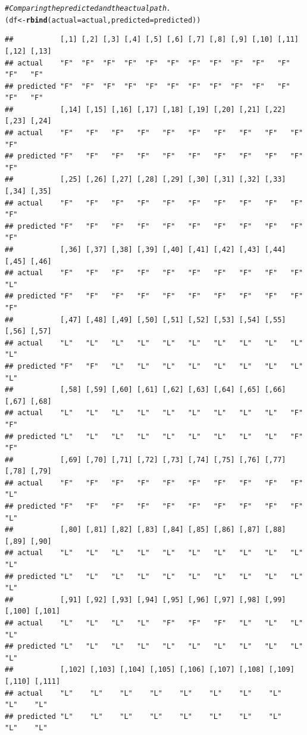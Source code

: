 \documentclass{article}\usepackage[]{graphicx}\usepackage[]{color}
\makeatletter
\newcommand{\hlcom}[1]{\textcolor[rgb]{0.678,0.584,0.686}{\textit{#1}}}%
\newcommand{\hlstd}[1]{\textcolor[rgb]{0.345,0.345,0.345}{#1}}%
\newcommand{\hlkwb}[1]{\textcolor[rgb]{0.69,0.353,0.396}{#1}}%
\newcommand{\hlkwc}[1]{\textcolor[rgb]{0.333,0.667,0.333}{#1}}%
\newcommand{\hlkwd}[1]{\textcolor[rgb]{0.737,0.353,0.396}{\textbf{#1}}}%
\newenvironment{kframe}{%
 \def\at@end@of@kframe{}%
 \ifinner\ifhmode%
  \def\at@end@of@kframe{\end{minipage}}%
  \begin{minipage}{\columnwidth}%
 \fi\fi%
 \def\FrameCommand##1{\hskip\@totalleftmargin \hskip-\fboxsep
 \colorbox{shadecolor}{##1}\hskip-\fboxsep
     \hskip-\linewidth \hskip-\@totalleftmargin \hskip\columnwidth}%
 \MakeFramed {\advance\hsize-\width
   \@totalleftmargin\z@ \linewidth\hsize
   \@setminipage}}%
 {\par\unskip\endMakeFramed%
 \at@end@of@kframe}
\newenvironment{knitrout}{}{} %
\makeatother
\begin{document}
\begin{knitrout}
\begin{kframe}
\begin{alltt}
\hlcom{# Comparing the predicted and the actual path. }
\hlstd{(df} \hlkwb{<-} \hlkwd{rbind}\hlstd{(}\hlkwc{actual} \hlstd{= actual,} \hlkwc{predicted} \hlstd{= predicted))}
\end{alltt}
\begin{verbatim}
##           [,1] [,2] [,3] [,4] [,5] [,6] [,7] [,8] [,9] [,10] [,11] [,12] [,13]
## actual    "F"  "F"  "F"  "F"  "F"  "F"  "F"  "F"  "F"  "F"   "F"   "F"   "F"  
## predicted "F"  "F"  "F"  "F"  "F"  "F"  "F"  "F"  "F"  "F"   "F"   "F"   "F"  
##           [,14] [,15] [,16] [,17] [,18] [,19] [,20] [,21] [,22] [,23] [,24]
## actual    "F"   "F"   "F"   "F"   "F"   "F"   "F"   "F"   "F"   "F"   "F"  
## predicted "F"   "F"   "F"   "F"   "F"   "F"   "F"   "F"   "F"   "F"   "F"  
##           [,25] [,26] [,27] [,28] [,29] [,30] [,31] [,32] [,33] [,34] [,35]
## actual    "F"   "F"   "F"   "F"   "F"   "F"   "F"   "F"   "F"   "F"   "F"  
## predicted "F"   "F"   "F"   "F"   "F"   "F"   "F"   "F"   "F"   "F"   "F"  
##           [,36] [,37] [,38] [,39] [,40] [,41] [,42] [,43] [,44] [,45] [,46]
## actual    "F"   "F"   "F"   "F"   "F"   "F"   "F"   "F"   "F"   "F"   "L"  
## predicted "F"   "F"   "F"   "F"   "F"   "F"   "F"   "F"   "F"   "F"   "F"  
##           [,47] [,48] [,49] [,50] [,51] [,52] [,53] [,54] [,55] [,56] [,57]
## actual    "L"   "L"   "L"   "L"   "L"   "L"   "L"   "L"   "L"   "L"   "L"  
## predicted "F"   "F"   "L"   "L"   "L"   "L"   "L"   "L"   "L"   "L"   "L"  
##           [,58] [,59] [,60] [,61] [,62] [,63] [,64] [,65] [,66] [,67] [,68]
## actual    "L"   "L"   "L"   "L"   "L"   "L"   "L"   "L"   "L"   "F"   "F"  
## predicted "L"   "L"   "L"   "L"   "L"   "L"   "L"   "L"   "L"   "F"   "F"  
##           [,69] [,70] [,71] [,72] [,73] [,74] [,75] [,76] [,77] [,78] [,79]
## actual    "F"   "F"   "F"   "F"   "F"   "F"   "F"   "F"   "F"   "F"   "L"  
## predicted "F"   "F"   "F"   "F"   "F"   "F"   "F"   "F"   "F"   "F"   "L"  
##           [,80] [,81] [,82] [,83] [,84] [,85] [,86] [,87] [,88] [,89] [,90]
## actual    "L"   "L"   "L"   "L"   "L"   "L"   "L"   "L"   "L"   "L"   "L"  
## predicted "L"   "L"   "L"   "L"   "L"   "L"   "L"   "L"   "L"   "L"   "L"  
##           [,91] [,92] [,93] [,94] [,95] [,96] [,97] [,98] [,99] [,100] [,101]
## actual    "L"   "L"   "L"   "L"   "F"   "F"   "F"   "L"   "L"   "L"    "L"   
## predicted "L"   "L"   "L"   "L"   "L"   "L"   "L"   "L"   "L"   "L"    "L"   
##           [,102] [,103] [,104] [,105] [,106] [,107] [,108] [,109] [,110] [,111]
## actual    "L"    "L"    "L"    "L"    "L"    "L"    "L"    "L"    "L"    "L"   
## predicted "L"    "L"    "L"    "L"    "L"    "L"    "L"    "L"    "L"    "L"   

\end{verbatim}
\end{kframe}
\end{knitrout}
\end{document}
